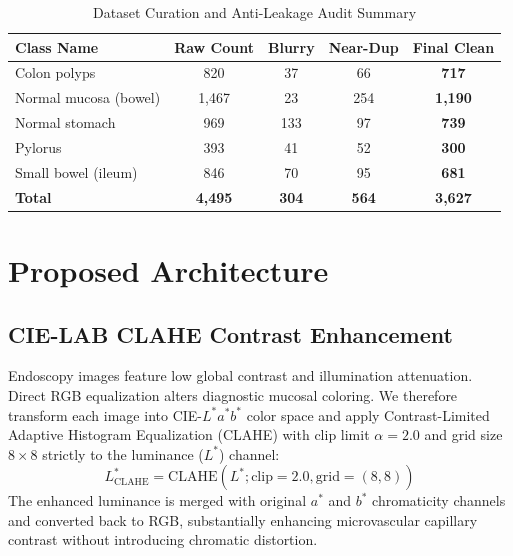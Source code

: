 \documentclass[conference]{IEEEtran}
\begin{document}
\begin{table}[htbp]
\caption{Dataset Curation and Anti-Leakage Audit Summary}
\label{tab:dataset_cleaning}
\begin{center}
\begin{tabular}{lcccc}
\toprule
\textbf{Class Name} & \textbf{Raw Count} & \textbf{Blurry} & \textbf{Near-Dup} & \textbf{Final Clean} \\
\midrule
Colon polyps & 820 & 37 & 66 & \textbf{717} \\
Normal mucosa (bowel) & 1,467 & 23 & 254 & \textbf{1,190} \\
Normal stomach & 969 & 133 & 97 & \textbf{739} \\
Pylorus & 393 & 41 & 52 & \textbf{300} \\
Small bowel (ileum) & 846 & 70 & 95 & \textbf{681} \\
\midrule
\textbf{Total} & \textbf{4,495} & \textbf{304} & \textbf{564} & \textbf{3,627} \\
\bottomrule
\end{tabular}
\end{center}
\end{table}

\section{Proposed Architecture}

\subsection{CIE-LAB CLAHE Contrast Enhancement}
Endoscopy images feature low global contrast and illumination attenuation. Direct RGB equalization alters diagnostic mucosal coloring. We therefore transform each image into CIE-$L^*a^*b^*$ color space and apply Contrast-Limited Adaptive Histogram Equalization (CLAHE) with clip limit $\alpha = 2.0$ and grid size $8 \times 8$ strictly to the luminance ($L^*$) channel:
\begin{equation}
L^*_{\text{CLAHE}} = \text{CLAHE}(L^*; \text{clip}=2.0, \text{grid}=(8,8))
\end{equation}
The enhanced luminance is merged with original $a^*$ and $b^*$ chromaticity channels and converted back to RGB, substantially enhancing microvascular capillary contrast without introducing chromatic distortion.
\end{document}
